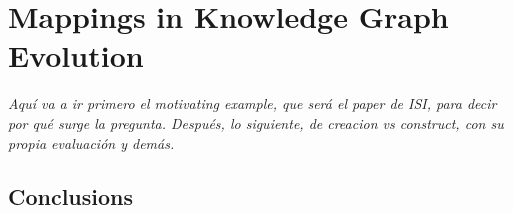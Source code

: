 

\chapter{Mappings in Knowledge Graph Evolution}
\label{chapter:reframing}

\textit{Aquí va a ir primero el motivating example, que será el paper de ISI, para decir por qué surge la pregunta. Después, lo siguiente, de creacion vs construct, con su propia evaluación y demás.}



\section{Conclusions}